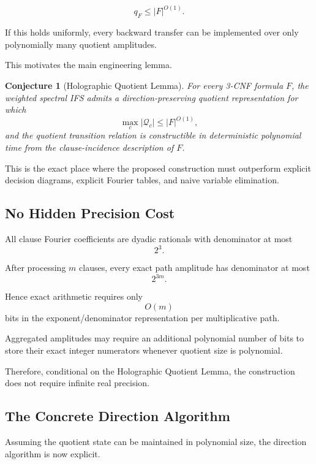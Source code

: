 \documentclass[11pt]{article}
\theoremstyle{plain}
\newtheorem{conjecture}[theorem]{Conjecture}
\theoremstyle{definition}
\begin{document}
\[
\boxed{
q_F\leq |F|^{O(1)}.
}
\]

If this holds uniformly, every backward transfer can be implemented over only
polynomially many quotient amplitudes.

This motivates the main engineering lemma.

\begin{conjecture}[Holographic Quotient Lemma]
\label{conj:holographic-quotient}
For every 3-CNF formula \(F\), the weighted spectral IFS admits a
direction-preserving quotient representation for which
\[
    \max_c|\mathcal{Q}_c|
    \leq
    |F|^{O(1)},
\]
and the quotient transition relation is constructible in deterministic
polynomial time from the clause-incidence description of \(F\).
\end{conjecture}

This is the exact place where the proposed construction must outperform
explicit decision diagrams, explicit Fourier tables, and naive variable
elimination.

\subsection{No Hidden Precision Cost}

All clause Fourier coefficients are dyadic rationals with denominator at most
\[
    2^3.
\]

After processing \(m\) clauses, every exact path amplitude has denominator at
most
\[
    2^{3m}.
\]

Hence exact arithmetic requires only
\[
    O(m)
\]
bits in the exponent/denominator representation per multiplicative path.

Aggregated amplitudes may require an additional polynomial number of bits to
store their exact integer numerators whenever quotient size is polynomial.

Therefore, conditional on the Holographic Quotient Lemma, the construction
does not require infinite real precision.

\subsection{The Concrete Direction Algorithm}

Assuming the quotient state can be maintained in polynomial size, the
direction algorithm is now explicit.
\end{document}
